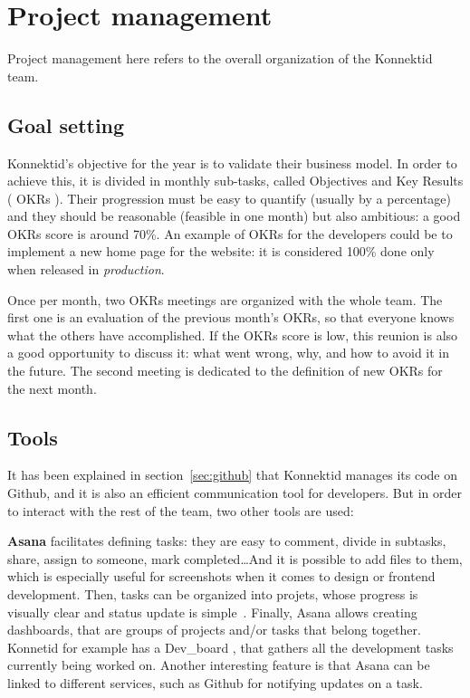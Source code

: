 \section{Project management}
\label{sec:management}

Project management here refers to the overall organization of the Konnektid team.

\subsection{Goal setting}
\label{ssec:goalSetting}

Konnektid's objective for the year is to validate their business model. In order to achieve this, it is divided in monthly sub-tasks, called Objectives and Key Results (\guillemotleft{} OKRs \guillemotright{}). Their progression must be easy to quantify (usually by a percentage) and they should be reasonable (feasible in one month) but also ambitious: a good OKRs score is around 70\%. An example of OKRs for the developers could be to implement a new home page for the website: it is considered 100\% done only when released in \textit{production}.

Once per month, two OKRs meetings are organized with the whole team. The first one is an evaluation of the previous month's OKRs, so that everyone knows what the others have accomplished. If the OKRs score is low, this reunion is also a good opportunity to discuss it: what went wrong, why, and how to avoid it in the future. The second meeting is dedicated to the definition of new OKRs for the next month.

\subsection{Tools}
\label{ssec:tools}

It has been explained in {\sc section}~\ref{sec:github} that Konnektid manages its code on Github, and it is also an efficient communication tool for developers. But in order to interact with the rest of the team, two other tools are used:

\textbf{Asana} facilitates defining tasks: they are easy to comment, divide in subtasks, share, assign to someone, mark completed\ldots And it is possible to add files to them, which is especially useful for screenshots when it comes to design or frontend development. Then, tasks can be organized into projets, whose progress is visually clear and status update is simple~\cite{asana}. Finally, Asana allows creating dashboards, that are groups of projects and/or tasks that belong together. Konnetid for example has a \guillemotleft{} Dev\_board \guillemotright{}, that gathers all the development tasks currently being worked on. Another interesting feature is that Asana can be linked to different services, such as Github for notifying updates on a task.


